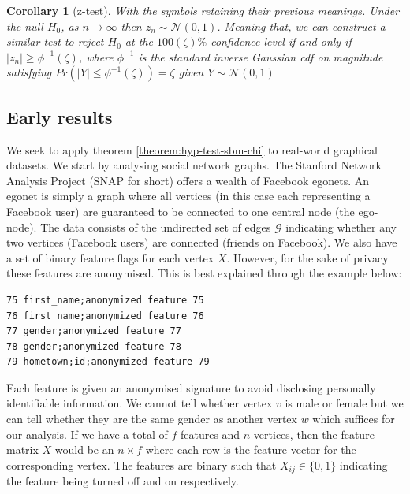 \documentclass[]{article}
\newcommand{\Gaussian}{\mathcal{N}}
\newcommand{\Gcal}{\mathcal{G}}
\newtheorem{corollary}{Corollary}[theorem]
\begin{document}
\begin{multicols*}{2}
\begin{corollary}[z-test]
	With the symbols retaining their previous meanings. Under the null $H_0$, as $n \rightarrow \infty$ then $z_n \sim \Gaussian(0, 1)$. Meaning that, we can construct a similar test to reject $H_0$ at the $100(\zeta)\%$ confidence level if and only if $|z_n| \geq \phi^{-1}(\zeta)$, where $\phi^{-1}$ is the standard inverse Gaussian cdf on magnitude satisfying $Pr(|Y| \leq \phi^{-1}(\zeta)) = \zeta$ given $Y \sim \Gaussian(0, 1)$
	\label{corollary:z-test}
\end{corollary}

\subsection{Early results}

We seek to apply theorem \ref{theorem:hyp-test-sbm-chi} to real-world graphical datasets. We start by analysing social network graphs. The Stanford Network Analysis Project (SNAP for short) \cite{snapnets} offers a wealth of Facebook egonets. An egonet is simply a graph where all vertices (in this case each representing a Facebook user) are guaranteed to be connected to one central node (the ego-node). The data consists of the undirected set of edges $\Gcal$ indicating whether any two vertices (Facebook users) are connected (friends on Facebook). We also have a set of binary feature flags for each vertex $X$. However, for the sake of privacy these features are anonymised. This is best explained through the example below: \\

\begin{center}
\begin{minipage}{8cm}
\begin{Verbatim}[fontsize=\small, frame=single, label={\fbox{Example anonymised feature flags}}]
75 first_name;anonymized feature 75
76 first_name;anonymized feature 76
77 gender;anonymized feature 77
78 gender;anonymized feature 78
79 hometown;id;anonymized feature 79
\end{Verbatim}
\end{minipage}
\end{center}


Each feature is given an anonymised signature to avoid disclosing personally identifiable information. We cannot tell whether vertex $v$ is male or female but we can tell whether they are the same gender as another vertex $w$ which suffices for our analysis. If we have a total of $f$ features and $n$ vertices, then the feature matrix $X$ would be an $n \times f$ where each row is the feature vector for the corresponding vertex. The features are binary such that $X_{ij} \in \{0, 1\}$ indicating the feature being turned off and on respectively.


\end{multicols*}
\end{document}
